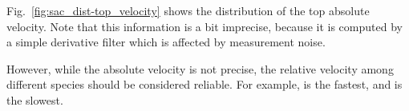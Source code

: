 Fig.~\ref{fig:sac_dist-top_velocity} shows the distribution of the top absolute velocity. 
Note that this information is a bit imprecise, because it is computed by a simple derivative filter which is affected by measurement noise. 

However, while the absolute velocity is not precise, the relative velocity among different species should be considered reliable. For example, \Dmelanogaster is the fastest, and  \Dhydei is the slowest.

